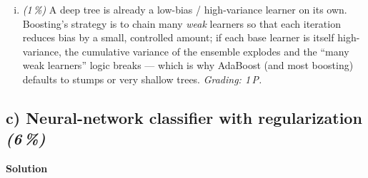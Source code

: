 \documentclass[11pt,a4paper]{article}
\newcommand{\subpoints}[1]{\textit{(#1\,\%)}}
\newcommand{\sol}{\noindent\textbf{Solution}}
\begin{document}
\begin{enumerate}[(i)]
  \item \subpoints{1} A deep tree is already a low-bias / high-variance learner on its own.
        Boosting's strategy is to chain many \emph{weak} learners so that each iteration reduces
        bias by a small, controlled amount; if each base learner is itself high-variance,
        the cumulative variance of the ensemble explodes and the ``many weak learners'' logic
        breaks --- which is why AdaBoost (and most boosting) defaults to stumps or very shallow trees.
        \emph{Grading: 1\,P.}
\end{enumerate}

\subsection*{c) Neural-network classifier with regularization \subpoints{6}}
\sol{}
\end{document}
